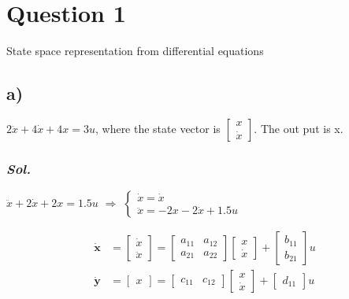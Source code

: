 \section{Question 1}
    State space representation from differential equations

    \subsection{a)} 
    $2\ddot{x} + 4\dot{x} + 4x=3u$, where the state vector is 
    $\begin{bmatrix}
        x \\
        \dot{x}
    \end{bmatrix}$.
    The out put is x.
    \subsubsection{\textit{ Sol. }}
    $\ddot{x} + 2\dot{x} + 2x=1.5u$ $\Rightarrow$ 
    $\left\{
        \begin{array}{lr}
        \dot{x} = \dot{x} \\
        \ddot{x} = -2x -2\dot{x} + 1.5u
        \end{array}
    \right.$

    \begin{align}
        \dot{\textbf{x}} &=
        \begin{bmatrix}
            \dot{x} \\
            \ddot{x}
        \end{bmatrix} = 
        \begin{bmatrix}
            a_{11} & a_{12} \\
            a_{21} & a_{22}
        \end{bmatrix}
        \begin{bmatrix}
            x \\
            \dot{x}
        \end{bmatrix} + 
        \begin{bmatrix}
            b_{11}\\
            b_{21}
        \end{bmatrix}
        u
        \\
        \dot{\textbf{y}} &=
        \begin{bmatrix}
            x
        \end{bmatrix} =
        \begin{bmatrix}
            c_{11} & c_{12}
        \end{bmatrix}
        \begin{bmatrix}
            x \\
            \dot{x}
        \end{bmatrix} + 
        \begin{bmatrix}
            d_{11}
        \end{bmatrix}
        u
    \end{align}


